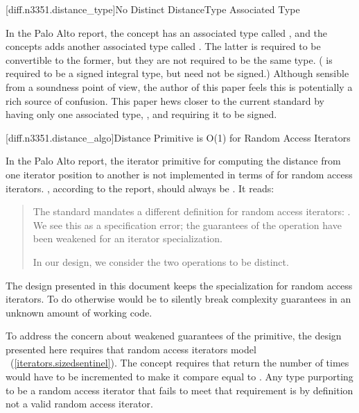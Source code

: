 [diff.n3351.distance_type]{No Distinct DistanceType Associated Type}

\pnum
In the Palo Alto report, the  concept has an associated type called
, and the  concepts adds another associated type
called . The latter is required to be convertible to the former, but they are
not required to be the same type. ( is required to be a signed integral type,
but  need not be signed.) Although sensible from a soundness point of view,
the author of this paper feels this is potentially a rich source of confusion. This paper hews
closer to the current standard by having only one associated type, , and
requiring it to be signed.

[diff.n3351.distance_algo]{Distance Primitive is O(1) for Random Access Iterators}

\pnum
In the Palo Alto report, the  iterator primitive for computing the distance from one
iterator position to another is not implemented in terms of  for random access
iterators. , according to the report, should always be . It reads:

\begin{quote}
The standard mandates a different definition for random access iterators:
. We see this as a specification error; the guarantees of the
 operation have been weakened for an iterator specialization.

In our design, we consider the two operations to be distinct.
\end{quote}

The design presented in this document keeps the specialization for random access iterators. To do
otherwise would be to silently break complexity guarantees in an unknown amount of working code.

To address the concern about weakened guarantees of the  primitive, the design
presented here requires that random access iterators model
~(\ref{iterators.sizedsentinel}). The 
concept requires that  return the number of times  would have to be
incremented to make it compare equal to . Any type purporting to be a random access
iterator that fails to meet that requirement is by definition not a valid random access iterator.

